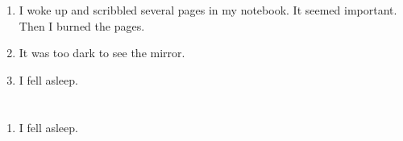 \documentclass{article}
\begin{document}
    \begin{enumerate}
    
    \item I woke up and scribbled several pages in my notebook. It seemed important. Then I burned the pages.\\
    
    \item It was too dark to see the mirror.\\
    
    \item I fell asleep.\\
    
    \end{enumerate}
     
    \newpage
    
    \section{}
    
    \begin{enumerate}
    
    \item I fell asleep.\\
    
    \end{enumerate}
     
    \newpage
    
    \section{}
    
\end{document}
